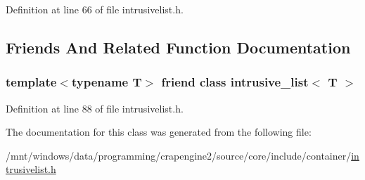 Definition at line 66 of file intrusivelist.\+h.



\subsection{Friends And Related Function Documentation}
\hypertarget{classcrap_1_1intrusive__node_a8abfe7a49da2ca301723ee176edb482f}{
\subsubsection[{intrusive\+\_\+list$<$ T $>$}]{\setlength{\rightskip}{0pt plus 5cm}template$<$typename T$>$ friend class {\bf intrusive\+\_\+list}$<$ T $>$\hspace{0.3cm}{\ttfamily [friend]}}}\label{classcrap_1_1intrusive__node_a8abfe7a49da2ca301723ee176edb482f}


Definition at line 88 of file intrusivelist.\+h.



The documentation for this class was generated from the following file\+:\begin{DoxyCompactItemize}
\item 
/mnt/windows/data/programming/crapengine2/source/core/include/container/\hyperlink{intrusivelist_8h}{intrusivelist.\+h}\end{DoxyCompactItemize}
